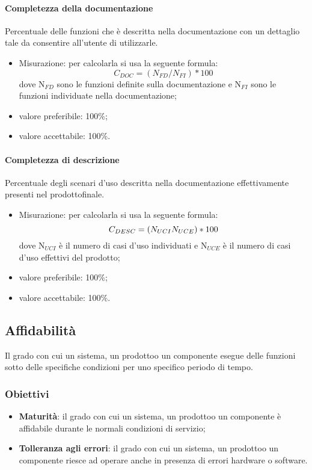             \paragraph{Completezza della documentazione}
                Percentuale delle funzioni che è descritta nella documentazione con un dettaglio tale da consentire all’utente di utilizzarle.
                \begin{itemize}
                    \item Misurazione: per calcolarla si usa la seguente formula:
                    \[C_{DOC}=(N_{FD}/N_{FI})*100\]
                    dove N$_{FD}$ sono le funzioni definite sulla documentazione e N$_{FI}$ sono le funzioni individuate nella documentazione;
                    \item valore preferibile: 100\%;
                    \item valore accettabile: 100\%.
                \end{itemize}
            \paragraph{Completezza di descrizione}
                Percentuale degli scenari d’uso descritta nella documentazione effettivamente presenti nel prodotto\glosp finale.
                \begin{itemize}
                    \item Misurazione: per calcolarla si usa la seguente formula:
                    \[C_{DESC}=(N_{UCI}\\N_{UCE})*100\]
                    dove N$_{UCI}$ è il numero di casi d'uso individuati e N$_{UCE}$ è il numero di casi d'uso effettivi del prodotto\glo;
                    \item valore preferibile: 100\%;
                    \item valore accettabile: 100\%.
                \end{itemize}
    \subsection{Affidabilità}
        Il grado con cui un sistema, un prodotto\glosp o un componente esegue delle funzioni sotto delle specifiche condizioni per uno specifico periodo di tempo.
        \subsubsection{Obiettivi}
            \begin{itemize}
                \item \textbf{Maturità}: il grado con cui un sistema, un prodotto\glosp o un componente è affidabile durante le normali condizioni di servizio;
                \item \textbf{Tolleranza agli errori}: il grado con cui un sistema, un prodotto\glosp o un componente riesce ad operare anche in presenza di errori hardware o software.
            \end{itemize}
